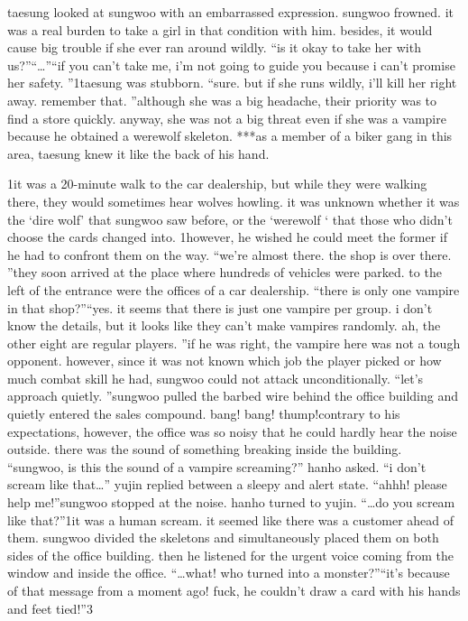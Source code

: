 taesung looked at sungwoo with an embarrassed expression.
 sungwoo frowned.
it was a real burden to take a girl in that condition with him.
 besides, it would cause big trouble if she ever ran around wildly.
“is it okay to take her with us?”“…”“if you can’t take me, i’m not going to guide you because i can’t promise her safety.
”1taesung was stubborn.
“sure.
 but if she runs wildly, i’ll kill her right away.
 remember that.
”although she was a big headache, their priority was to find a store quickly.
anyway, she was not a big threat even if she was a vampire because he obtained a werewolf skeleton.
***as a member of a biker gang in this area, taesung knew it like the back of his hand.


1it was a 20-minute walk to the car dealership, but while they were walking there, they would sometimes hear wolves howling.
 it was unknown whether it was the ‘dire wolf’ that sungwoo saw before, or the ‘werewolf ‘ that those who didn’t choose the cards changed into.
1however, he wished he could meet the former if he had to confront them on the way.
“we’re almost there.
 the shop is over there.
”they soon arrived at the place where hundreds of vehicles were parked.
to the left of the entrance were the offices of a car dealership.
“there is only one vampire in that shop?”“yes.
 it seems that there is just one vampire per group.
 i don’t know the details, but it looks like they can’t make vampires randomly.
 ah, the other eight are regular players.
”if he was right, the vampire here was not a tough opponent.
 however, since it was not known which job the player picked or how much combat skill he had, sungwoo could not attack unconditionally.
“let’s approach quietly.
”sungwoo pulled the barbed wire behind the office building and quietly entered the sales compound.
bang! bang! thump!contrary to his expectations, however, the office was so noisy that he could hardly hear the noise outside.
 there was the sound of something breaking inside the building.
“sungwoo, is this the sound of a vampire screaming?” hanho asked.
“i don’t scream like that…” yujin replied between a sleepy and alert state.
“ahhh! please help me!”sungwoo stopped at the noise.
 hanho turned to yujin.
“…do you scream like that?”1it was a human scream.
 it seemed like there was a customer ahead of them.
sungwoo divided the skeletons and simultaneously placed them on both sides of the office building.
 then he listened for the urgent voice coming from the window and inside the office.
“…what! who turned into a monster?”“it’s because of that message from a moment ago! fuck, he couldn’t draw a card with his hands and feet tied!”3

 